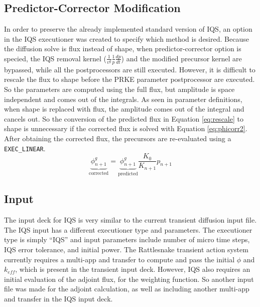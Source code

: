 \documentclass[10pt]{scrartcl}
\newcommand{\be}{\begin{equation}}
\newcommand{\ee}{\end{equation}}
\begin{document}
\subsection{Predictor-Corrector Modification}
In order to preserve the already implemented standard version of IQS, an option in the IQS executioner was created to specify which method is desired.  Because the diffusion solve is flux instead of shape, when predictor-corrector option is specied, the IQS removal kernel ($\frac{1}{v^g}\frac{1}{p}\frac{dp}{dt}$) and the modified precursor kernel are bypassed, while all the postprocessors are still executed.  However, it is difficult to rescale the flux to shape before the PRKE parameter postprocessor are executed.  So the parameters are computed using the full flux, but amplitude is space independent and comes out of the integrals.  As seen in parameter definitions, when shape is replaced with flux, the amplitude comes out of the integral and cancels out.  So the conversion of the predicted flux in Equation \ref{eq:rescale} to shape is unnecessary if the corrected flux is solved with Equation \ref{eq:phicorr2}.  After obtaining the corrected flux, the precursors are re-evaluated using a \texttt{EXEC\_LINEAR}.
\be
\underbrace{\phi^g_{n+1}}_{\text{corrected}} = \underbrace{\phi^g_{n+1}}_{\text{predicted}} \frac{K_0}{K_{n+1}} p_{n+1}
\label{eq:phicorr2}
\ee

\subsection{Input}
The input deck for IQS is very similar to the current transient diffusion input file.  The IQS input has a different executioner type and parameters.  The executioner type is simply “IQS” and input parameters include number of micro time steps, IQS error tolerance, and initial power.  The Rattlesnake transient action system currently requires a multi-app and transfer to compute and pass the initial $\phi$ and $k_{eff}$, which is present in the transient input deck.  However, IQS also requires an initial evaluation of the adjoint flux, for the weighting function.  So another input file was made for the adjoint calculation, as well as including another multi-app and transfer in the IQS input deck.
\end{document}
